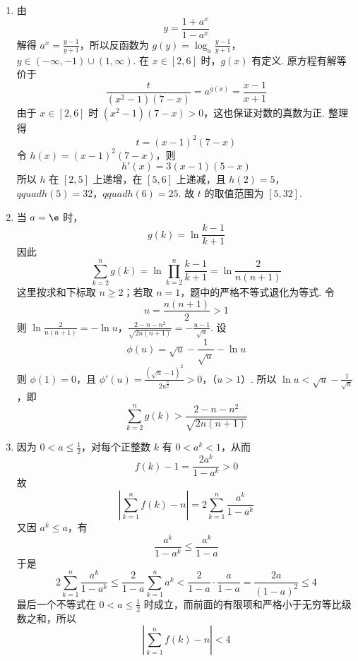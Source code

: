 \begin{solution}
\begin{enumerate}
\item 由
\[
y=\frac{1+a^x}{1-a^x}
\]
解得 \(a^x=\frac{y-1}{y+1}\)，所以反函数为
\(g(y)=\log_a\frac{y-1}{y+1}\)，\(y\in(-\infty,-1)\cup(1,\infty)\).
在 \(x\in[2,6]\) 时，\(g(x)\) 有定义. 原方程有解等价于
\[
\frac{t}{(x^2-1)(7-x)}=a^{g(x)}=\frac{x-1}{x+1}
\]
由于 \(x\in[2,6]\) 时 \((x^2-1)(7-x)>0\)，这也保证对数的真数为正. 整理得
\[
t=(x-1)^2(7-x)
\]
令 \(h(x)=(x-1)^2(7-x)\)，则
\[
h'(x)=3(x-1)(5-x)
\]
所以 \(h\) 在 \([2,5]\) 上递增，在 \([5,6]\) 上递减，且
\(h(2)=5\)，\(qquad h(5)=32\)，\(qquad h(6)=25\).
故 \(t\) 的取值范围为 \([5,32]\).

\item 当 \(a=\e\) 时，
\[
g(k)=\ln\frac{k-1}{k+1}
\]
因此
\[
\sum_{k=2}^{n}g(k)
=\ln\prod_{k=2}^{n}\frac{k-1}{k+1}
=\ln\frac{2}{n(n+1)}
\]
这里按求和下标取 \(n\geq2\)；若取 \(n=1\)，题中的严格不等式退化为等式. 令
\[
u=\frac{n(n+1)}2>1
\]
则
\(\ln\frac{2}{n(n+1)}=-\ln u\)，\(\frac{2-n-n^2}{\sqrt{2n(n+1)}}=-\frac{u-1}{\sqrt u}\).
设
\[
\phi(u)=\sqrt u-\frac1{\sqrt u}-\ln u
\]
则 \(\phi(1)=0\)，且
\(\phi'(u)=\frac{(\sqrt u-1)^2}{2u^{\frac{3}{2}}}>0\)，（\(u>1\)）.
所以 \(\ln u<\sqrt u-\frac1{\sqrt u}\)，即
\[
\sum_{k=2}^{n}g(k)>\frac{2-n-n^2}{\sqrt{2n(n+1)}}
\]

\item 因为 \(0<a\leq\frac12\)，对每个正整数 \(k\) 有 \(0<a^k<1\)，从而
\[
f(k)-1=\frac{2a^k}{1-a^k}>0
\]
故
\[
\left|\sum_{k=1}^{n}f(k)-n\right|
=2\sum_{k=1}^{n}\frac{a^k}{1-a^k}
\]
又因 \(a^k\leq a\)，有
\[
\frac{a^k}{1-a^k}\leq\frac{a^k}{1-a}
\]
于是
\[
2\sum_{k=1}^{n}\frac{a^k}{1-a^k}
\leq\frac{2}{1-a}\sum_{k=1}^{n}a^k
<\frac{2}{1-a}\cdot\frac{a}{1-a}
=\frac{2a}{(1-a)^2}\leq4
\]
最后一个不等式在 \(0<a\leq\frac12\) 时成立，而前面的有限项和严格小于无穷等比级数之和，所以
\[
\left|\sum_{k=1}^{n}f(k)-n\right|<4
\]
\end{enumerate}
\end{solution}
